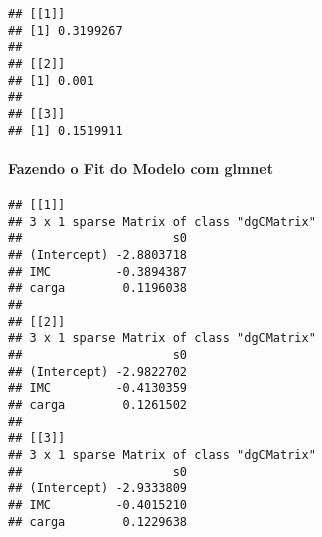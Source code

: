 \documentclass[]{article}
\newenvironment{Shaded}{\begin{snugshade}}{\end{snugshade}}
\newcommand{\DataTypeTok}[1]{\textcolor[rgb]{0.13,0.29,0.53}{#1}}
\newcommand{\DecValTok}[1]{\textcolor[rgb]{0.00,0.00,0.81}{#1}}
\newcommand{\KeywordTok}[1]{\textcolor[rgb]{0.13,0.29,0.53}{\textbf{#1}}}
\newcommand{\NormalTok}[1]{#1}
\newcommand{\OperatorTok}[1]{\textcolor[rgb]{0.81,0.36,0.00}{\textbf{#1}}}
\newcommand{\OtherTok}[1]{\textcolor[rgb]{0.56,0.35,0.01}{#1}}
\newcommand{\StringTok}[1]{\textcolor[rgb]{0.31,0.60,0.02}{#1}}
\let\oldparagraph\paragraph
\renewcommand{\paragraph}[1]{\oldparagraph{#1}\mbox{}}
\begin{document}
\begin{verbatim}
## [[1]]
## [1] 0.3199267
## 
## [[2]]
## [1] 0.001
## 
## [[3]]
## [1] 0.1519911
\end{verbatim}

\hypertarget{fazendo-o-fit-do-modelo-com-glmnet}{%
\paragraph{Fazendo o Fit do Modelo com
glmnet}\label{fazendo-o-fit-do-modelo-com-glmnet}}

\begin{Shaded}
\end{Shaded}

\begin{verbatim}
## [[1]]
## 3 x 1 sparse Matrix of class "dgCMatrix"
##                     s0
## (Intercept) -2.8803718
## IMC         -0.3894387
## carga        0.1196038
## 
## [[2]]
## 3 x 1 sparse Matrix of class "dgCMatrix"
##                     s0
## (Intercept) -2.9822702
## IMC         -0.4130359
## carga        0.1261502
## 
## [[3]]
## 3 x 1 sparse Matrix of class "dgCMatrix"
##                     s0
## (Intercept) -2.9333809
## IMC         -0.4015210
## carga        0.1229638
\end{verbatim}
\end{document}
